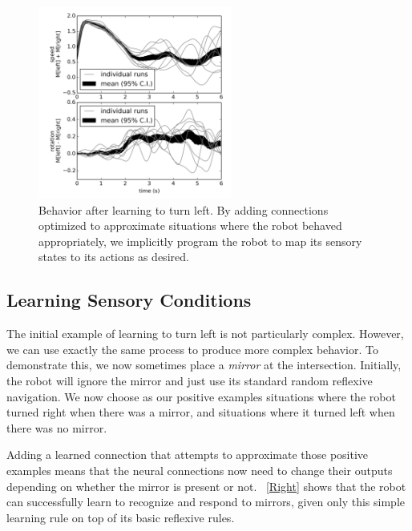 \documentclass[conference]{IEEEtran}
\begin{document}
\begin{figure}[!t]
\centering
\includegraphics[width=2.5in]{learn-left/learnleft.png}
\caption{Behavior after learning to turn left. By adding connections optimized to approximate situations where the robot behaved appropriately, we implicitly program the robot to map its sensory states to its actions as desired.}
\label{Left}
\end{figure}

\subsection{Learning Sensory Conditions} \label{learningConditions}

The initial example of learning to turn left is not particularly complex. 
However, we can use exactly the same process to produce more complex behavior.
To demonstrate this, we now sometimes place a \textit{mirror} at the intersection.
Initially, the robot will ignore the mirror and just use its standard random
reflexive navigation.  We now choose as our positive examples situations where
the robot turned right when there was a mirror, and situations where it turned
left when there was no mirror.

Adding a learned connection that attempts to approximate those positive
examples means that the neural connections now need to change their outputs
depending on whether the mirror is present or not.  \figurename~\ref{Right} shows 
that the robot can successfully learn to recognize and respond to mirrors,
given only this simple learning rule on top of its basic reflexive rules.
\end{document}

